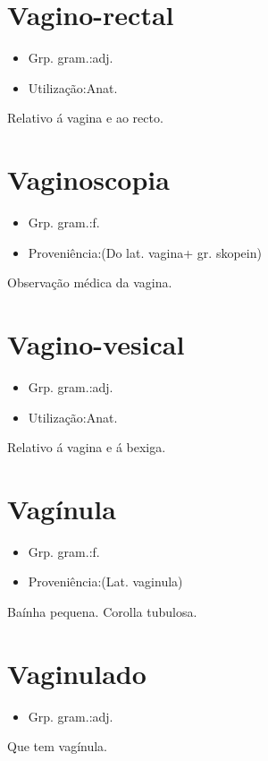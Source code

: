 \documentclass{article}
\begin{document}
\section{Vagino-rectal}
\begin{itemize}
\item {Grp. gram.:adj.}
\end{itemize}
\begin{itemize}
\item {Utilização:Anat.}
\end{itemize}
Relativo á vagina e ao recto.
\section{Vaginoscopia}
\begin{itemize}
\item {Grp. gram.:f.}
\end{itemize}
\begin{itemize}
\item {Proveniência:(Do lat. \textunderscore vagina\textunderscore  + gr. \textunderscore skopein\textunderscore )}
\end{itemize}
Observação médica da vagina.
\section{Vagino-vesical}
\begin{itemize}
\item {Grp. gram.:adj.}
\end{itemize}
\begin{itemize}
\item {Utilização:Anat.}
\end{itemize}
Relativo á vagina e á bexiga.
\section{Vagínula}
\begin{itemize}
\item {Grp. gram.:f.}
\end{itemize}
\begin{itemize}
\item {Proveniência:(Lat. \textunderscore vaginula\textunderscore )}
\end{itemize}
Baínha pequena.
Corolla tubulosa.
\section{Vaginulado}
\begin{itemize}
\item {Grp. gram.:adj.}
\end{itemize}
Que tem vagínula.
\end{document}
